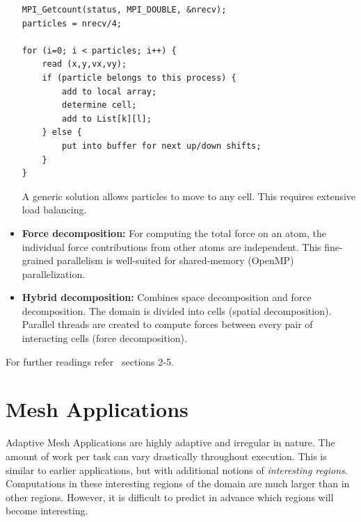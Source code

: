 \documentclass[12pt]{book}
\begin{document}
\begin{itemize}
\begin{lstlisting}[style=cppstyle]
MPI_Getcount(status, MPI_DOUBLE, &nrecv);
particles = nrecv/4;

for (i=0; i < particles; i++) {
    read (x,y,vx,vy);
    if (particle belongs to this process) {
        add to local array;
        determine cell;
        add to List[k][l];
    } else {
        put into buffer for next up/down shifts;
    }
}
    \end{lstlisting}

    A generic solution allows particles to move to any cell. This requires extensive load balancing.

    \item \textbf{Force decomposition:}  
    For computing the total force on an atom, the individual force contributions from other atoms are independent. This fine-grained parallelism is well-suited for shared-memory (OpenMP) parallelization.

    \item \textbf{Hybrid decomposition:}  
    Combines space decomposition and force decomposition. The domain is divided into cells (spatial decomposition). Parallel threads are created to compute forces between every pair of interacting cells (force decomposition).
\end{itemize}

For further readings refer~\cite{plimpton1996new} sections 2-5.

\section{Mesh Applications}

Adaptive Mesh Applications are highly adaptive and irregular in nature. The amount of work per task can vary drastically throughout execution. This is similar to earlier applications, but with additional notions of \emph{interesting regions}. Computations in these interesting regions of the domain are much larger than in other regions. However, it is difficult to predict in advance which regions will become interesting. 
\end{document}
